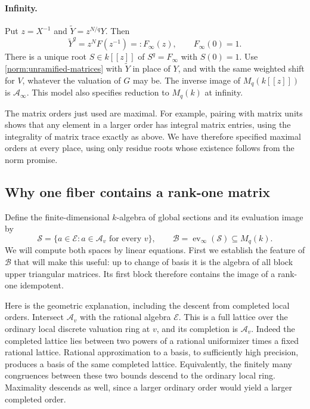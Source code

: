 \paragraph{Infinity.}
Put $z=X^{-1}$ and $\widetilde Y=z^{N/q}Y$.  Then
\[
 \widetilde Y^q=z^NF(z^{-1})=:F_\infty(z),\qquad F_\infty(0)=1.
\]
There is a unique root $S\in k[[z]]$ of $S^q=F_\infty$ with $S(0)=1$.
Use \eqref{norm:unramified-matrices} with $\widetilde Y$ in place of
$Y$, and with the same weighted shift for $V$, whatever the valuation
of $G$ may be.  The inverse image of $M_q(k[[z]])$ is $\mathcal A_\infty$.
This model also specifies reduction to $M_q(k)$ at infinity.

The matrix orders just used are maximal.  For example, pairing with
matrix units shows that any element in a larger order has integral
matrix entries, using the integrality of matrix trace exactly as
above.  We have therefore specified maximal orders at every place,
using only residue roots whose existence follows from the norm
promise.

\subsection{Why one fiber contains a rank-one matrix}

Define the finite-dimensional $k$-algebra of global sections and its
evaluation image by
\begin{equation}\label{norm:sections-fiber}
 \mathcal S=\{a\in\mathcal E:a\in\mathcal A_v\text{ for every }v\},
 \qquad
 \mathcal B=\operatorname{ev}_\infty(\mathcal S)\subseteq M_q(k).
\end{equation}
We will compute both spaces by linear equations.  First we establish
the feature of $\mathcal B$ that will make this useful: up to change of
basis it is the algebra of all block upper triangular matrices.  Its
first block therefore contains the image of a rank-one idempotent.

Here is the geometric explanation, including the descent from
completed local orders.  Intersect $\mathcal A_v$ with the rational
algebra $\mathcal E$.  This is a full lattice over the ordinary local
discrete valuation ring at $v$, and its completion is
$\mathcal A_v$.  Indeed the completed lattice lies between two powers
of a rational uniformizer times a fixed rational lattice.  Rational
approximation to a basis, to sufficiently high precision, produces a
basis of the same completed lattice.  Equivalently, the finitely many
congruences between these two bounds descend to the ordinary local
ring.  Maximality descends as well, since a larger ordinary order
would yield a larger completed order.

